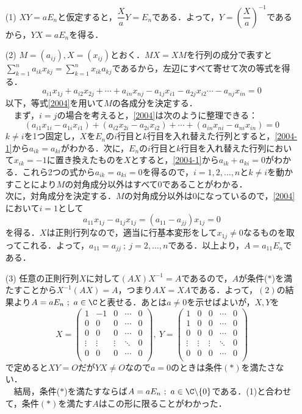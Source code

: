 \documentclass[a4paper,11pt]{ltjsarticle}
\begin{document}
\begin{itemize}
    \item [(1)]$XY=aE_n$と仮定すると，$\dfrac{X}{a}Y=E_n$である．よって，$Y=\left(\dfrac{X}{a}\right)^{-1}$であるから，$YX=aE_n$を得る．\\[3pt]
\item[(2)]$M=(a_{ij}),X=(x_{ij})$とおく．$MX=XM$を行列の成分で表すと$\sum_{k=1}^na_{ik}x_{kj}=\sum_{k=1}^nx_{ik}a_{kj}$であるから，左辺にすべて寄せて次の等式を得る．
\begin{equation}\label{2004}
    a_{i1}x_{1j}+a_{i2}x_{2j}+\cdots+a_{in}x_{nj}-a_{1j}x_{i1}-a_{2j}x_{i2}\cdots-a_{nj}x_{in}=0 \tag{$\dag$}
\end{equation}
以下，等式\eqref{2004}を用いて$M$の各成分を決定する．\\
　まず，$i=j$の場合を考えると，\eqref{2004}は次のように整理できる：
\begin{equation}\label{2004-1}
    (a_{i1}x_{1i}-a_{1i}x_{i1})+(a_{i2}x_{2i}-a_{2i}x_{i2})+\cdots+(a_{in}x_{ni}-a_{ni}x_{in})=0 \tag{$\dag\dag$}
\end{equation}$k\neq i$を1つ固定し，$X$を$E_n$の$i$行目と$k$行目を入れ替えた行列とすると，\eqref{2004-1}から$a_{ik}=a_{ki}$がわかる．次に，$E_n$の$i$行目と$k$行目を入れ替えた行列において$x_{ik}=-1$に置き換えたものを$X$とすると，\eqref{2004-1}から$a_{ik}+a_{ki}=0$がわかる．これら2つの式から$a_{ik}=a_{ki}=0$を得るので，$i=1,2,\ldots,n$と$k\neq i$を動かすことにより$M$の対角成分以外はすべて$0$であることがわかる．\\[3pt]
次に，対角成分を決定する．$M$の対角成分以外は0になっているので，\eqref{2004}において$i=1$として\[a_{11}x_{1j}-a_{1j}x_{1j}=(a_{11}-a_{jj})x_{1j}=0\]
を得る．$X$は正則行列なので，適当に行基本変形をして$x_{1j}\neq0$なるものを取ってこれる．よって，$a_{11}=a_{jj}~;~j=2,\ldots,n$である．以上より，$A=a_{11}E_n$である．\\[3pt]
\item[(3)]任意の正則行列$X$に対して$(AX)X^{-1}=A$であるので，$A$が条件($\ast$)を満たすことから$X^{-1}(AX)=A$，つまり$AX=XA$である．よって，$(2)$の結果より$A=aE_n~;~a\in\C$と表せる．あとは$a\neq0$を示せばよいが，$X,Y$を
\[
X=
\begin{pmatrix}
    1 & -1&0 &\cdots&0\\
    0 & 0&0 &\cdots&0\\
    0&0&0 &\cdots&0\\
    \vdots&\vdots&\vdots &\ddots&0\\
    0&0&0 &\cdots&0\\
    \end{pmatrix} ,~Y=
\begin{pmatrix}
1 & 0&0 &\cdots&0\\
1 & 0&0 &\cdots&0\\
0&0&0 &\cdots&0\\
\vdots&\vdots&\vdots &\ddots&0\\
0&0&0 &\cdots&0\\
\end{pmatrix} 
\]
で定めると$XY=O$だが$YX\neq O$なので$a=0$のときは条件$(\ast)$を満たさない．\\
　結局，条件($\ast$)を満たすならば$A=aE_n~;~a\in\C\backslash\{0\}$である．(1)と合わせて，条件$(\ast)$を満たす$A$はこの形に限ることがわかった．
\end{itemize}
\end{document}
